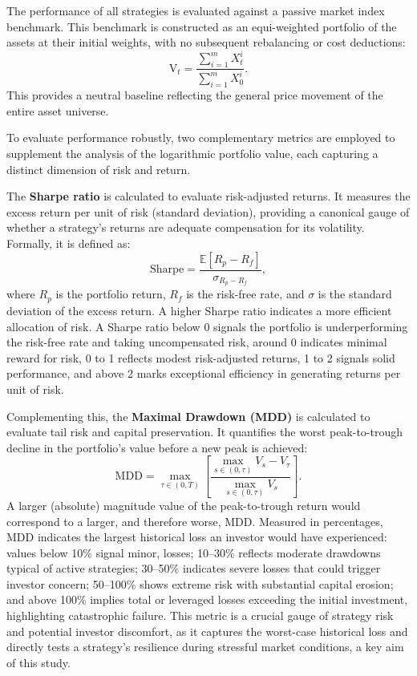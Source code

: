 \documentclass[12pt,a4paper]{report}
\begin{document}
The performance of all strategies is evaluated against a passive market index benchmark. This benchmark is constructed as an equi-weighted portfolio of the assets at their initial weights, with no subsequent rebalancing or cost deductions:
\begin{equation}
\text{V}_t = \frac{ \sum_{i=1}^m X^i_t }{ \sum_{i=1}^m X^i_0 }.
\label{eq:market_index}
\end{equation}
This provides a neutral baseline reflecting the general price movement of the entire asset universe.

To evaluate performance robustly, two complementary metrics are employed to supplement the analysis of the logarithmic portfolio value, each capturing a distinct dimension of risk and return.

The \textbf{Sharpe ratio} \citep{Sharpe1994} is calculated to evaluate risk-adjusted returns. It measures the excess return per unit of risk (standard deviation), providing a canonical gauge of whether a strategy's returns are adequate compensation for its volatility. Formally, it is defined as:
\begin{equation}
    \text{Sharpe} = \frac{ \mathbb{E}[R_p - R_f] }{ \sigma_{R_p - R_f} },
\end{equation}
where \(R_p\) is the portfolio return, \(R_f\) is the risk-free rate, and \(\sigma\) is the standard deviation of the excess return. A higher Sharpe ratio indicates a more efficient allocation of risk. A Sharpe ratio below 0 signals the portfolio is underperforming the risk-free rate and taking uncompensated risk, around 0 indicates minimal reward for risk, 0 to 1 reflects modest risk-adjusted returns, 1 to 2 signals solid performance, and above 2 marks exceptional efficiency in generating returns per unit of risk.

Complementing this, the \textbf{Maximal Drawdown (MDD)} \citep{MagdonIsmail2004} is calculated to evaluate tail risk and capital preservation. It quantifies the worst peak-to-trough decline in the portfolio's value before a new peak is achieved:
\begin{equation}
\text{MDD} = \max_{\tau \in (0,T)} \left[ \frac{ \max_{s \in (0,\tau)} V_s - V_\tau }{ \max_{s \in (0,\tau)} V_s } \right].
\label{eq:mdd}
\end{equation}
A larger (absolute) magnitude value of the peak-to-trough return would correspond to a larger, and therefore worse, MDD. Measured in percentages, MDD indicates the largest historical loss an investor would have experienced: values below 10\% signal minor, losses; 10–30\% reflects moderate drawdowns typical of active strategies; 30–50\% indicates severe losses that could trigger investor concern; 50–100\% shows extreme risk with substantial capital erosion; and above 100\% implies total or leveraged losses exceeding the initial investment, highlighting catastrophic failure. This metric is a crucial gauge of strategy risk and potential investor discomfort, as it captures the worst-case historical loss and directly tests a strategy's resilience during stressful market conditions, a key aim of this study.
\end{document}
